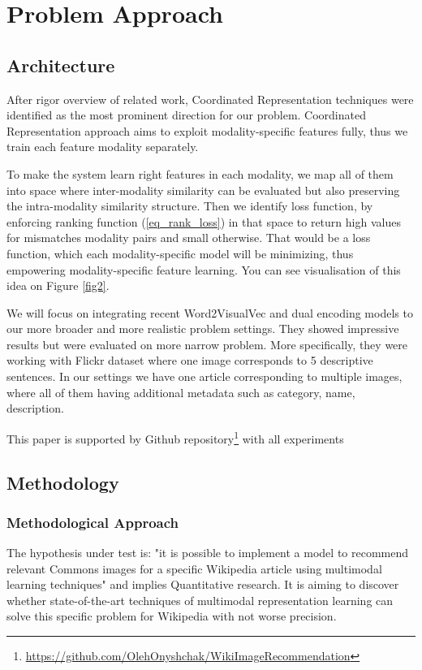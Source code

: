 \chapter{Problem Approach}
\section{Architecture}
After rigor overview of related work, Coordinated Representation techniques were identified as the most prominent direction for our problem. Coordinated Representation approach aims to exploit modality-specific features fully, thus we train each feature modality separately.

To make the system learn right features in each modality, we map all of them into space where inter-modality similarity can be evaluated but also preserving the intra-modality similarity structure\cite{ref_cross_modal_hash, ref_devise, ref_kiros}. Then we identify loss function, by enforcing ranking function (\ref{eq_rank_loss}) in that space to return high values for mismatches modality pairs and small otherwise. That would be a loss function, which each modality-specific model will be minimizing, thus empowering modality-specific feature learning. You can see visualisation of this idea on Figure \ref{fig2}.

We will focus on integrating recent Word2VisualVec\cite{ref_w2vv} and dual encoding\cite{ref_dual_encoding} models to our more broader and more realistic problem settings. They showed impressive results but were evaluated on more narrow problem. More specifically, they were working with Flickr dataset\cite{ref_flickr} where one image corresponds to 5 descriptive sentences. In our settings we have one article corresponding to multiple images, where all of them having additional metadata such as category, name, description.

This paper is supported by Github repository\footnote{\url{https://github.com/OlehOnyshchak/WikiImageRecommendation}} with all experiments

\section{Methodology}
\subsection{Methodological Approach}
The hypothesis under test is: "it is possible to implement a model to recommend relevant Commons\cite{ref_wiki_commons} images for a specific Wikipedia article using multimodal learning techniques" and implies Quantitative research. It is aiming to discover whether state-of-the-art techniques of multimodal representation learning can solve this specific problem for Wikipedia with not worse precision. 

